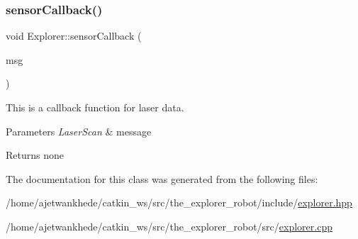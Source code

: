 \subsubsection{\texorpdfstring{sensor\+Callback()}{sensorCallback()}}
{\footnotesize\ttfamily void Explorer\+::sensor\+Callback (\begin{DoxyParamCaption}\item[{const sensor\+\_\+msgs\+::\+Laser\+Scan\+::\+Const\+Ptr \&}]{msg }\end{DoxyParamCaption})}



This is a callback function for laser data. 


\begin{DoxyParams}{Parameters}
{\em Laser\+Scan} & message\\
\hline
\end{DoxyParams}
\begin{DoxyReturn}{Returns}
none 
\end{DoxyReturn}


The documentation for this class was generated from the following files\+:\begin{DoxyCompactItemize}
\item 
/home/ajetwankhede/catkin\+\_\+ws/src/the\+\_\+explorer\+\_\+robot/include/\mbox{\hyperlink{explorer_8hpp}{explorer.\+hpp}}\item 
/home/ajetwankhede/catkin\+\_\+ws/src/the\+\_\+explorer\+\_\+robot/src/\mbox{\hyperlink{explorer_8cpp}{explorer.\+cpp}}\end{DoxyCompactItemize}
